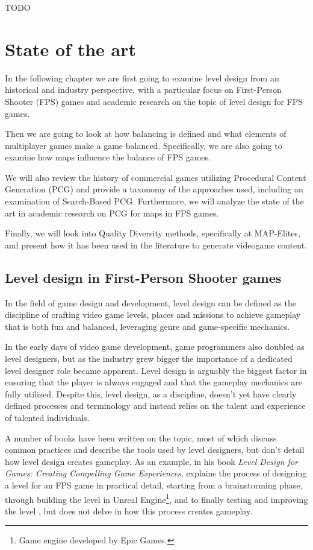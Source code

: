 \documentclass{Configuration_Files/PoliMi3i_thesis}
\begin{document}
TODO

\chapter{State of the art}
\label{ch:state_of_the_art}
In the following chapter we are first going to examine level design from an historical and industry perspective, with a particular focus on First-Person Shooter (FPS) games and academic research on the topic of level design for FPS games.

Then we are going to look at how balancing is defined and what elements of multiplayer games make a game balanced. Specifically, we are also going to examine how maps influence the balance of FPS games.

We will also review the history of commercial games utilizing Procedural Content Generation (PCG) and provide a taxonomy of the approaches used, including an examination of Search-Based PCG. Furthermore, we will analyze the state of the art in academic research on PCG for maps in FPS games.

Finally, we will look into Quality Diversity methods, specifically at MAP-Elites, and present how it has been used in the literature to generate videogame content.

\section{Level design in First-Person Shooter games}
\label{sec:level_design}
In the field of game design and development, level design can be defined as the discipline of crafting video game levels, places and missions to achieve gameplay that is both fun and balanced, leveraging genre and game-specific mechanics.

In the early days of video game development, game programmers also doubled as level designers, but as the industry grew bigger the importance of a dedicated level designer role became apparent. Level design is arguably the biggest factor in ensuring that the player is always engaged and that the gameplay mechanics are fully utilized. Despite this, level design, as a discipline, doesn't yet have clearly defined processes and terminology and instead relies on the talent and experience of talented individuals.

A number of books have been written on the topic, most of which discuss common practices and describe the tools used by level designers, but don't detail how level design creates gameplay. As an example, in his book \textit{Level Design for Games: Creating Compelling Game Experiences},  explains the process of designing a level for an FPS game in practical detail, starting from a brainstorming phase, through building the level in Unreal Engine\footnote{Game engine developed by Epic Games.}, and to finally testing and improving the level \cite{co_level_2006}, but does not delve in how this process creates gameplay. \cite{hullett_design_2010}
\end{document}
